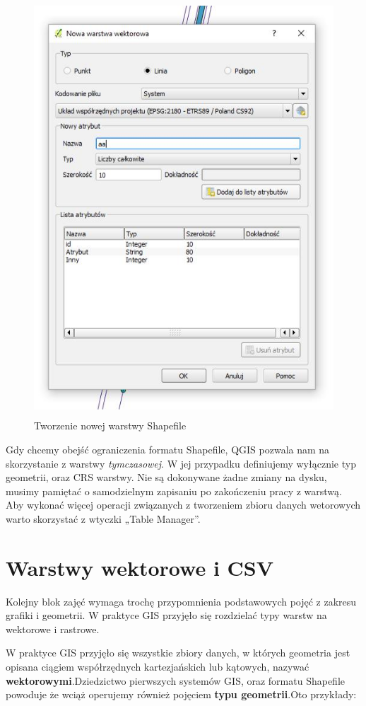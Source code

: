 \documentclass[12pt,a4paper]{book}
\begin{document}
\begin{figure}[!ht]
	\centering
	\includegraphics[width=11.599cm,height=15.579cm]{002-nowy-wektor.jpg}
	\caption{Tworzenie nowej warstwy Shapefile}
\end{figure}
Gdy chcemy obejść ograniczenia formatu Shapefile, QGIS pozwala nam na skorzystanie z warstwy \textit{tymczasowej}. W jej przypadku definiujemy wyłącznie typ geometrii, oraz CRS warstwy. Nie są dokonywane żadne zmiany na dysku, musimy pamiętać o samodzielnym zapisaniu po zakończeniu pracy z warstwą. Aby wykonać więcej  operacji związanych z tworzeniem zbioru danych wetorowych warto skorzystać z wtyczki „Table Manager”.

\chapter{Warstwy wektorowe i CSV}
Kolejny blok zajęć wymaga trochę przypomnienia podstawowych pojęć z zakresu grafiki i geometrii. W praktyce GIS przyjęło się rozdzielać typy warstw na wektorowe i rastrowe.

W praktyce GIS przyjęło się wszystkie zbiory danych, w których geometria jest opisana ciągiem współrzędnych kartezjańskich lub kątowych, nazywać \textbf{wektorowymi}.Dziedzictwo pierwszych systemów GIS, oraz formatu Shapefile powoduje że wciąż operujemy również pojęciem \textbf{typu geometrii}.Oto przykłady:
\end{document}
